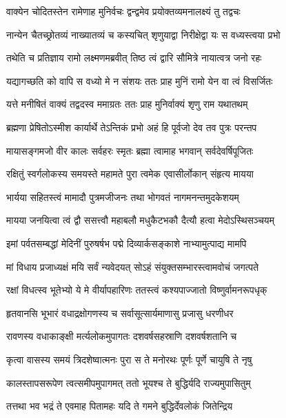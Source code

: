 \twolineshloka
{वाक्येन चोदितस्तेन रामेणाह मुनिर्वचः}
{द्वन्द्वमेव प्रयोक्तव्यमनालक्ष्यं तु तद्वचः} %

\twolineshloka
{नान्येन चैतच्छ्रोतव्यं नाख्यातव्यं च कस्यचित्}
{शृणुयाद्वा निरीक्षेद्वा यः स वध्यस्त्वया प्रभो} %

\twolineshloka
{तथेति च प्रतिज्ञाय रामो लक्ष्मणमब्रवीत्}
{तिष्ठ त्वं द्वारि सौमित्रे नायात्वत्र जनो रहः} %

\twolineshloka
{यद्यागच्छति को वापि स वध्यो मे न संशयः}
{ततः प्राह मुनिं रामो येन वा त्वं विसर्जितः} %

\twolineshloka
{यत्ते मनीषितं वाक्यं तद्वदस्व ममाग्रतः}
{ततः प्राह मुनिर्वाक्यं शृणु राम यथातथम्} %

\twolineshloka
{ब्रह्मणा प्रेषितोऽस्मीश कार्यार्थे तेऽन्तिकं प्रभो}
{अहं हि पूर्वजो देव तव पुत्रः परन्तप} %

\twolineshloka
{मायासङ्गमजो वीर कालः सर्वहरः स्मृतः}
{ब्रह्मा त्वामाह भगवान् सर्वदेवर्षिपूजितः} %

\twolineshloka
{रक्षितुं स्वर्गलोकस्य समयस्ते महामते}
{पुरा त्वमेक एवासीर्लोकान् संहृत्य मायया} %

\twolineshloka
{भार्यया सहितस्त्वं मामादौ पुत्रमजीजनः}
{तथा भोगवतं नागमनन्तमुदकेशयम्} %

\twolineshloka
{मायया जनयित्वा त्वं द्वौ ससत्त्वौ महाबलौ}
{मधुकैटभकौ दैत्यौ हत्वा मेदोऽस्थिसञ्चयम्} %

\twolineshloka
{इमां पर्वतसम्बद्धां मेदिनीं पुरुषर्षभ}
{पद्मे दिव्यार्कसङ्काशे नाभ्यामुत्पाद्य मामपि} %

\twolineshloka
{मां विधाय प्रजाध्यक्षं मयि सर्वं न्यवेदयत्}
{सोऽहं संयुक्तसम्भारस्त्वामवोचं जगत्पते} %

\twolineshloka
{रक्षां विधत्स्व भूतेभ्यो ये मे वीर्यापहारिणः}
{ततस्त्वं कश्यपाज्जातो विष्णुर्वामनरूपधृक्} %

\twolineshloka
{हृतवानसि भूभारं वधाद्रक्षोगणस्य च}
{सर्वासूत्सार्यमाणासु प्रजासु धरणीधर} %

\twolineshloka
{रावणस्य वधाकाङ्क्षी मर्त्यलोकमुपागतः}
{दशवर्षसहस्राणि दशवर्षशतानि च} %

\twolineshloka
{कृत्वा वासस्य समयं त्रिदशेष्वात्मनः पुरा}
{स ते मनोरथः पूर्णः पूर्णे चायुषि ते नृषु} %

\twolineshloka
{कालस्तापसरूपेण त्वत्समीपमुपागमत्}
{ततो भूयश्च ते बुद्धिर्यदि राज्यमुपासितुम्} %

\twolineshloka
{तत्तथा भव भद्रं ते एवमाह पितामहः}
{यदि ते गमने बुद्धिर्देवलोकं जितेन्द्रिय} %

